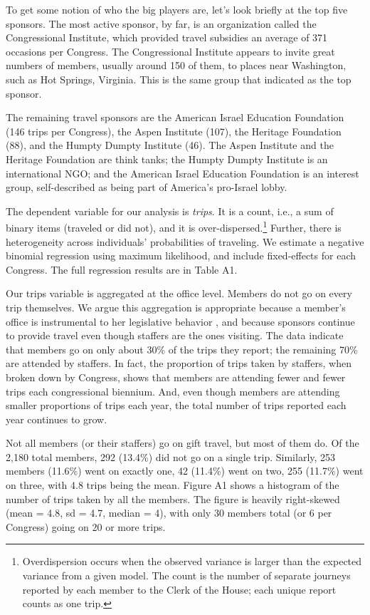 \documentclass[12pt]{article}                           %
\begin{document}
To get some notion of who the big players are, let's look briefly at the top five sponsors. The most active sponsor, by far, is an organization called the Congressional Institute, which provided travel subsidies an average of 371 occasions per Congress. The Congressional Institute appears to invite great numbers of members, usually around 150 of them, to places near Washington, such as Hot Springs, Virginia. This is the same group that \cite{Rosenson2009} indicated as the top sponsor.

The remaining travel sponsors are the American Israel Education Foundation (146 trips per Congress), the Aspen Institute (107), the Heritage Foundation (88), and the Humpty Dumpty Institute (46). The Aspen Institute and the Heritage Foundation are think tanks; the Humpty Dumpty Institute is an international NGO; and the American Israel Education Foundation is an interest group, self-described as being part of America's pro-Israel lobby.

The dependent variable for our analysis is \emph{trips}. It is a count, i.e., a sum of binary items (traveled or did not), and it is over-dispersed.\footnote{Overdispersion occurs when the observed variance is larger than the expected variance from a given model. The count is the number of separate journeys reported by each member to the Clerk of the House; each unique report counts as one trip.} Further, there is heterogeneity across individuals' probabilities of traveling. We estimate a negative binomial regression using maximum likelihood, and include fixed-effects for each Congress. The full regression results are in Table A1.

Our trips variable is aggregated at the office level. Members do not go on every trip themselves. We argue this aggregation is appropriate because a member's office is instrumental to her legislative behavior \citep{Mayhew1974}, and because sponsors continue to provide travel even though staffers are the ones visiting. The data indicate that members go on only about 30\% of the trips they report; the remaining 70\% are attended by staffers. In fact, the proportion of trips taken by staffers, when broken down by Congress, shows that members are attending fewer and fewer trips each congressional biennium. And, even though members are attending smaller proportions of trips each year, the total number of trips reported each year continues to grow.

Not all members (or their staffers) go on gift travel, but most of them do. Of the 2,180 total members, 292 (13.4\%) did not go on a single trip. Similarly, 253 members (11.6\%) went on exactly one, 42 (11.4\%) went on two, 255 (11.7\%) went on three, with 4.8 trips being the mean. Figure A1 shows a histogram of the number of trips taken by all the members. The figure is heavily right-skewed (mean = 4.8, sd = 4.7, median = 4), with only 30 members total (or 6 per Congress) going on 20 or more trips.
\end{document}
